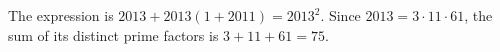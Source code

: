 The expression is $2013+2013(1+2011)=2013^2$. Since $2013=3\cdot11\cdot61$, the sum of its distinct prime factors is $3+11+61=\boxed{75}$.
